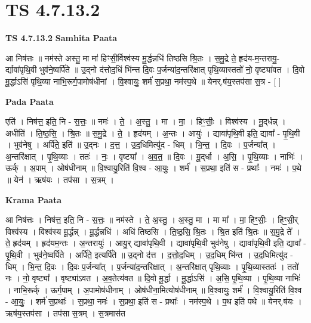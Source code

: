 \documentclass[17pt]{extarticle}
\begin{document}
\section{ TS 4.7.13.2 }

\textbf{TS 4.7.13.2 } \newline
\textbf{Samhita Paata} \newline

आ निष॑त्तः ॥ नम॑स्ते अस्तु॒ मा मा॑ हिꣳसी॒र्विश्व॑स्य मू॒र्द्धन्नधि॑ तिष्ठसि श्रि॒तः । स॒मु॒द्रे ते॒ हृद॑य-म॒न्तरायु॒-र्द्यावा॑पृथि॒वी भुव॑ने॒ष्वर्पि॑ते ॥ उ॒द्नो द॑त्तोद॒धिं भि॑न्त्त दि॒वः प॒र्जन्या॑द॒न्तरि॑क्षात् पृथि॒व्यास्ततो॑ नो॒ वृष्ट्या॑वत । दि॒वो मू॒र्द्धाऽसि॑ पृथि॒व्या नाभि॒रूर्ग॒पामोष॑धीनां । वि॒श्वायुः॒ शर्म॑ स॒प्रथा॒ नम॑स्प॒थे ॥ येनर्.ष॑य॒स्तप॑सा स॒त्र - [  ] \newline

\textbf{Pada Paata} \newline

एति॑ । निष॑त्त॒ इति॒ नि - स॒त्तः॒ ॥ नमः॑ । ते॒ । अ॒स्तु॒ । मा । मा॒ । हिꣳ॒॒सीः॒ । विश्व॑स्य । मू॒द्‌र्धन्न् । अधीति॑ । ति॒ष्ठ॒सि॒ । श्रि॒तः ॥ स॒मु॒द्रे । ते॒ । हृद॑यम् । अ॒न्तः । आयुः॑ । द्यावा॑पृथि॒वी इति॒ द्यावा᳚ - पृ॒थि॒वी । भुव॑नेषु । अर्पि॑ते॒ इति॑ ॥ उ॒द्नः । द॒त्त॒ । उ॒द॒धिमित्यु॑द - धिम् । भि॒न्त॒ । दि॒वः । प॒र्जन्या᳚त् । अ॒न्तरि॑क्षात् । पृ॒थि॒व्याः । ततः॑ । नः॒ । वृष्ट्या᳚ । अ॒व॒त॒ ॥ दि॒वः । मू॒द्‌र्धा । अ॒सि॒ । पृ॒थि॒व्याः । नाभिः॑ । ऊर्क् । अ॒पाम् । ओष॑धीनाम् ॥ वि॒श्वायु॒रिति॑ वि॒श्व - आ॒युः॒ । शर्म॑ । स॒प्रथा॒ इति॑ स - प्रथाः᳚ । नमः॑ । प॒थे ॥ येन॑ । ऋष॑यः । तप॑सा । स॒त्रम् ।  \newline


\textbf{Krama Paata} \newline

आ निष॑त्तः । निष॑त्त॒ इति॒ नि - स॒त्तः॒ ॥ नम॑स्ते । ते॒ अ॒स्तु॒ । अ॒स्तु॒ मा । मा मा᳚ । मा॒ हिꣳ॒॒सीः॒ । हिꣳ॒॒सी॒र् विश्व॑स्य । विश्व॑स्य मू॒र्द्धन्न् । मू॒र्द्धन्नधि॑ । अधि॑ तिष्ठसि । ति॒ष्ठ॒सि॒ श्रि॒तः । श्रि॒त इति॑ श्रि॒तः ॥ स॒मु॒द्रे ते᳚ । ते॒ हृद॑यम् । हृद॑यम॒न्तः । अ॒न्तरायुः॑ । आयु॒र् द्यावा॑पृथि॒वी । द्यावा॑पृथि॒वी भुव॑नेषु । द्यावा॑पृथि॒वी इति॒ द्यावा᳚ - पृ॒थि॒वी । भुव॑ने॒ष्वर्पि॑ते । अर्पि॑ते॒ इत्यर्पि॑ते ॥ उ॒द्नो द॑त्त । द॒त्तो॒द॒धिम् । उ॒द॒धिम् भि॑न्त । उ॒द॒धिमित्यु॑द - धिम् । भि॒न्त॒ दि॒वः । दि॒वः प॒र्जन्या᳚त् । प॒र्जन्या॑द॒न्तरि॑क्षात् । अ॒न्तरि॑क्षात् पृथि॒व्याः । पृ॒थि॒व्यास्ततः॑ । ततो॑ नः । नो॒ वृष्ट्या᳚ । वृष्ट्या॑ऽवत । अ॒व॒तेत्य॑वत ॥ दि॒वो मू॒र्द्धा । मू॒र्द्धाऽसि॑ । अ॒सि॒ पृ॒थि॒व्या । पृ॒थि॒व्या नाभिः॑ । 
नाभि॒रूर्क् । ऊर्ग॒पाम् । अ॒पामोष॑धीनाम् । ओष॑धीना॒मित्योष॑धीनाम् ॥ वि॒श्वायुः॒ शर्म॑ । वि॒श्वायु॒रिति॑ वि॒श्व - आ॒युः॒ । शर्म॑ स॒प्रथाः᳚ । स॒प्रथा॒ नमः॑ । स॒प्रथा॒ इति॑ स - प्रथाः᳚ । नम॑स्प॒थे । प॒थ इति॑ पथे ॥ येनर्.ष॑यः । ऋष॑य॒स्तप॑सा । तप॑सा स॒त्रम् । स॒त्रमास॑त \newline
\end{document}
